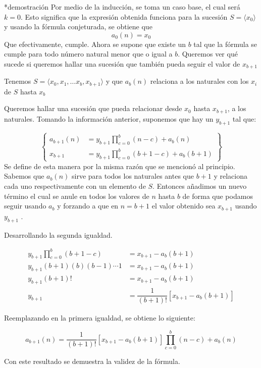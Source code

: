 \begin{proofbox}*{demostración}
    Por medio de la inducción, se toma un caso base, el cual será $k=0$. Esto significa que la expresión obtenida funciona para la sucesión $S = \langle x_0\rangle$
    y usando la fórmula conjeturada, se obtiene que
    \[a_0(n) = x_0 \]
    Que efectivamente, cumple.
    Ahora se supone que existe un $b$ tal que la fórmula se cumple para todo número natural menor que o igual a $b$. Queremos ver qué sucede si queremos hallar una sucesión que también pueda seguir el valor de $x_{b+1}$

    Tenemos $S = \langle x_0, x_1, \dots x_b, x_{b+1}\rangle$
    y que $a_b(n)$ relaciona a los naturales con los $x_i$ de $S$ hasta $x_b$

    Queremos hallar una sucesión que pueda relacionar desde $x_0$ hasta $x_{b+1}$, a los naturales. Tomando la información anterior, suponemos que hay un $y_{b+1}$ tal que:

    \begin{equation*}
        \left\{
            \begin{aligned}
                a_{b+1}(n) &= y_{b+1} \displaystyle\prod_{c=0}^{b}(n-c) + a_b(n)\\
                x_{b+1} &= y_{b+1} \displaystyle\prod_{c=0}^{b}(b+1 - c) + a_b(b + 1)                
            \end{aligned}
        \right\}
    \end{equation*}
    Se define de esta manera por la misma razón que se mencionó al principio. Sabemos que $a_b(n)$ sirve para todos los naturales antes que $b+1$ y relaciona cada uno respectivamente con un elemento de $S$. Entonces añadimos un nuevo término el cual se anule en todos los valores de $n$ hasta $b$ de forma que podamos seguir usando $a_b$ y forzando a que en $n=b+1$ el valor obtenido sea $x_{b+1}$ usando $y_{b+1}$ .

    Desarrollando la segunda igualdad.

    \begin{align*}
        y_{b+1} \displaystyle\prod_{c=0}^{b}(b+1 - c) &= x_{b+1} - a_b(b+1)\\
        y_{b+1} (b+1)(b)(b-1)\cdots 1 &= x_{b+1} - a_b(b+1)\\
        y_{b+1} (b+1)! &= x_{b+1} - a_b(b+1)\\
        y_{b+1} &= \dfrac{1}{(b+1)!}[x_{b+1} - a_b(b+1)]
    \end{align*}

    Reemplazando en la primera igualdad, se obtiene lo siguiente:

    \[a_{b+1}(n) = \dfrac{1}{(b+1)!}[x_{b+1} - a_b(b+1)]\displaystyle\prod_{c=0}^{b}(n-c) + a_b(n)\]

    Con este resultado se demuestra la validez de la fórmula.
\end{proofbox}